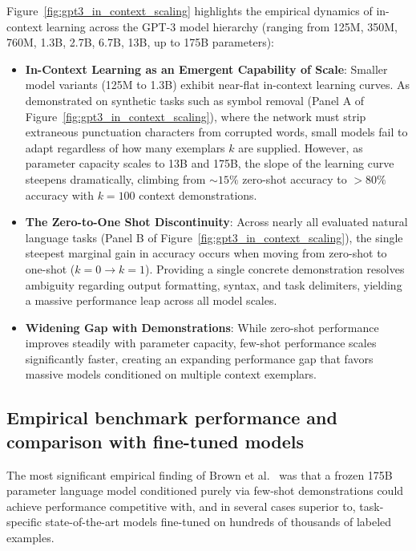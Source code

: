 \documentclass[../../../main.tex]{subfiles}
\begin{document}
Figure~\ref{fig:gpt3_in_context_scaling} highlights the empirical dynamics of in-context learning across the GPT-3 model hierarchy (ranging from 125M, 350M, 760M, 1.3B, 2.7B, 6.7B, 13B, up to 175B parameters):
\begin{itemize}
    \item \textbf{In-Context Learning as an Emergent Capability of Scale}: Smaller model variants (125M to 1.3B) exhibit near-flat in-context learning curves. As demonstrated on synthetic tasks such as symbol removal (Panel A of Figure~\ref{fig:gpt3_in_context_scaling}), where the network must strip extraneous punctuation characters from corrupted words, small models fail to adapt regardless of how many exemplars $k$ are supplied. However, as parameter capacity scales to 13B and 175B, the slope of the learning curve steepens dramatically, climbing from $\sim 15\%$ zero-shot accuracy to $>80\%$ accuracy with $k = 100$ context demonstrations.
    
    \item \textbf{The Zero-to-One Shot Discontinuity}: Across nearly all evaluated natural language tasks (Panel B of Figure~\ref{fig:gpt3_in_context_scaling}), the single steepest marginal gain in accuracy occurs when moving from zero-shot to one-shot ($k=0 \to k=1$). Providing a single concrete demonstration resolves ambiguity regarding output formatting, syntax, and task delimiters, yielding a massive performance leap across all model scales.
    
    \item \textbf{Widening Gap with Demonstrations}: While zero-shot performance improves steadily with parameter capacity, few-shot performance scales significantly faster, creating an expanding performance gap that favors massive models conditioned on multiple context exemplars.
\end{itemize}


\subsection{Empirical benchmark performance and comparison with fine-tuned models}
\label{subsec:gpt3_empirical_results}

The most significant empirical finding of Brown et al.~\cite{brown2020} was that a frozen 175B parameter language model conditioned purely via few-shot demonstrations could achieve performance competitive with, and in several cases superior to, task-specific state-of-the-art models fine-tuned on hundreds of thousands of labeled examples.
\end{document}
